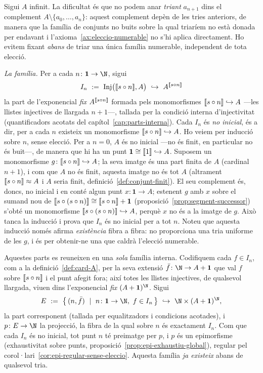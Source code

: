 \begin{prova}
Sigui \(A\) infinit. La dificultat és que no podem anar \emph{triant}
\(a_{n+1}\) dins el complement \(A\setminus\{a_0,\dots,a_n\}\): aquest
complement depèn de les tries anteriors, de manera que la família de
conjunts no buits sobre la qual triaríem no està donada per endavant i
l'axioma~\ref{ax:eleccio-numerable} no s'hi aplica directament. Ho evitem
fixant \emph{abans} de triar una única família numerable, independent de
tota elecció.

\emph{La família.} Per a cada \(n\colon\mathbf1\to\N\), sigui
\[
I_n\ :=\ \operatorname{Inj}\bigl(\llbracket s\circ n\rrbracket,A\bigr)\ \hookrightarrow\
A^{\llbracket s\circ n\rrbracket}
\]
la part de l'exponencial \emph{fix} \(A^{\llbracket s\circ n\rrbracket}\) formada pels
monomorfismes \(\llbracket s\circ n\rrbracket\hookrightarrow A\) ---les llistes
injectives de llargada \(n+1\)---, tallada per la condició interna
d'injectivitat (quantificadors acotats del capítol~\ref{cap:parts-interna}).
Cada \(I_n\) és \emph{no inicial}, és a dir, per a cada \(n\) existeix un
monomorfisme \(\llbracket s\circ n\rrbracket\hookrightarrow A\). Ho veiem per inducció
sobre \(n\), sense elecció. Per a \(n=0\), \(A\) és no inicial ---no és
finit, en particular no és buit---, de manera que hi ha un punt
\(\mathbf1\cong\llbracket 1\rrbracket\hookrightarrow A\). Suposem un monomorfisme
\(g\colon\llbracket s\circ n\rrbracket\hookrightarrow A\); la seva imatge és una part
finita de \(A\) (cardinal \(n+1\)), i com que \(A\) no és finit, aquesta
imatge no és tot \(A\) (altrament \(\llbracket s\circ n\rrbracket\approx A\) i \(A\) seria
finit, definició~\ref{def:conjunt-finit}). El seu complement és, doncs, no
inicial i en conté algun punt \(x\colon\mathbf1\to A\); estenent \(g\) amb
\(x\) sobre el sumand nou de \(\llbracket s\circ(s\circ n)\rrbracket\cong\llbracket s\circ
n\rrbracket+\mathbf1\) (proposició~\ref{prop:segment-successor}) s'obté un
monomorfisme \(\llbracket s\circ(s\circ n)\rrbracket\hookrightarrow A\), perquè \(x\) no
és a la imatge de \(g\). Això tanca la inducció i prova que
\(I_n\) és no inicial per a tot \(n\). Noteu que aquesta inducció només
afirma \emph{existència} fibra a fibra: no proporciona una tria uniforme de
les \(g\), i és per obtenir-ne una que caldrà l'elecció numerable.

Aquestes parts es reuneixen en una \emph{sola} família interna. Codifiquem
cada \(f\in I_n\), com a la definició~\ref{def:card-A}, per la seva
extensió \(\bar f\colon\N\to A+\mathbf1\) que val \(f\) sobre
\(\llbracket s\circ n\rrbracket\) i el punt afegit fora; així totes les llistes
injectives, de qualsevol llargada, viuen dins l'exponencial \emph{fix}
\((A+\mathbf1)^{\N}\). Sigui
\[
E\ :=\ \bigl\{\,(n,\bar f)\ \mid\ n\colon\mathbf1\to\N,\ f\in I_n\,\bigr\}\
\hookrightarrow\ \N\times(A+\mathbf1)^{\N},
\]
la part corresponent (tallada per equalitzadors i condicions acotades), i
\(p\colon E\to\N\) la projecció, la fibra de la qual sobre \(n\) és
exactament \(I_n\). Com que cada \(I_n\) és no inicial, tot punt \(n\) té preimatge per \(p\),
i \(p\) és un epimorfisme (exhaustivitat sobre punts,
proposició~\ref{prop:epi-exhaustiu-global}), regular pel
corol·lari~\ref{cor:epi-regular-sense-eleccio}.
Aquesta família \emph{ja existeix} abans de qualsevol tria.


\end{prova}

